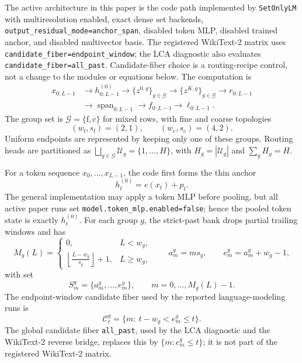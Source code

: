 \documentclass{article}
\theoremstyle{plain}
\theoremstyle{definition}
\theoremstyle{remark}
\begin{document}
The active architecture in this paper is the code path implemented by
\texttt{SetOnlyLM} with multiresolution enabled, exact dense set backends,
\texttt{output\_residual\_mode=anchor\_span}, disabled token MLP, disabled
trained anchor, and disabled multivector basis.  The registered WikiText-2
matrix uses \texttt{candidate\_fiber=endpoint\_window}; the LCA diagnostic
also evaluates \texttt{candidate\_fiber=all\_past}.  Candidate-fiber choice is
a routing-recipe control, not a change to the modules or equations below.
The computation is
\[
\begin{aligned}
x_{0:L-1}&\longrightarrow h^{(0)}_{0:L-1}
\longrightarrow \{z^{0,g}\}_{g\in\mathcal G}
\longrightarrow \{z^{K,g}\}_{g\in\mathcal G}
\longrightarrow r_{0:L-1}\\
&\longrightarrow \operatorname{span}_{0:L-1}
\longrightarrow f_{0:L-1}
\longrightarrow \ell_{0:L-1}.
\end{aligned}
\]
The group set is $\mathcal G=\{\mathrm f,\mathrm c\}$ for mixed rows, with
fine and coarse topologies
\[
(w_{\mathrm f},s_{\mathrm f})=(2,1),\qquad
(w_{\mathrm c},s_{\mathrm c})=(4,2).
\]
Uniform endpoints are represented by keeping only one of these groups.  Routing
heads are partitioned as
$\bigsqcup_{g\in\mathcal G}\mathcal U_g=\{1,\ldots,H\}$, with
$H_g=|\mathcal U_g|$ and $\sum_gH_g=H$.

For a token sequence $x_0,\ldots,x_{L-1}$, the code first forms the thin anchor
\begin{equation}
\label{eq:main-token-state}
h_t^{(0)}=e(x_t)+p_t .
\end{equation}
The general implementation may apply a token MLP before pooling, but all active
paper runs set \texttt{model.token\_mlp.enabled=false}; hence the pooled token
state is exactly $h_t^{(0)}$.  For each group $g$, the strict-past bank drops
partial trailing windows and has
\begin{equation}
\label{eq:main-bank}
M_g(L)=
\begin{cases}
0,&L<w_g,\\
\left\lfloor\frac{L-w_g}{s_g}\right\rfloor+1,&L\ge w_g,
\end{cases}
\qquad
a_m^g=ms_g,\qquad e_m^g=a_m^g+w_g-1,
\end{equation}
with set
\begin{equation}
\label{eq:main-bank-set}
S_m^g=\{a_m^g,\ldots,e_m^g\},\qquad m=0,\ldots,M_g(L)-1 .
\end{equation}
The endpoint-window candidate fiber used by the reported language-modeling
runs is
\begin{equation}
\label{eq:main-strict-past-candidates}
\mathcal C_t^g=\{m:\ t-w_g<e_m^g\le t\}.
\end{equation}
The global candidate fiber \texttt{all\_past}, used by the LCA diagnostic and
the WikiText-2 reverse bridge, replaces this by $\{m:e_m^g\le t\}$; it is not
part of the registered WikiText-2 matrix.
\end{document}
